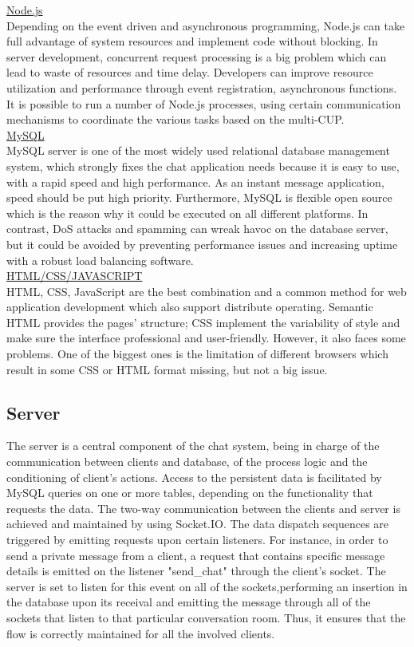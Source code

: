 \documentclass{article}
\begin{document}
\begin{enumerate}
	\underline{Node.js} \\ 
	Depending on the event driven and asynchronous programming, Node.js can take full advantage of system resources and implement code without blocking. In server development, concurrent request processing is a big problem which can lead to waste of resources and time delay. Developers can improve resource utilization and performance through event registration, asynchronous functions. It is possible to run a number of Node.js processes, using certain communication mechanisms to coordinate the various tasks based on the multi-CUP.\\
	
	\underline{MySQL}\\
	MySQL server is one of the most widely used relational database management system, which strongly fixes the chat application needs because it is easy to use, with a rapid speed and high performance. As an instant message application, speed should be put high priority. Furthermore, MySQL is flexible open source which is the reason why it could be executed on all different platforms. In contrast, DoS attacks and spamming can wreak havoc on the database server, but it could be avoided by preventing performance issues and increasing uptime with a robust load balancing software.\\
	
	\underline{HTML/CSS/JAVASCRIPT}\\
	HTML, CSS, JavaScript are the best combination and a common method for web application development which also support distribute operating. Semantic HTML provides the pages’ structure; CSS implement the variability of style and make sure the interface professional and user-friendly. However, it also faces some problems. One of the biggest ones is the limitation of different browsers which result in some CSS or HTML format missing, but not a big issue.\\
	
	\subsection{Server}
	The server is a central component of the chat system, being in charge of the communication between clients and database, of the process logic and the conditioning of client's actions. Access to the persistent data is facilitated by MySQL queries on one or more tables, depending on the functionality that requests the data. The two-way communication between the clients and server is achieved and maintained by using Socket.IO. The data dispatch sequences are triggered by emitting requests upon certain listeners. For instance, in order to send a private message from a client, a request that contains specific message details is emitted on the listener "send\_chat" through the client's socket. The server is set to listen for this event on all of the sockets,performing an insertion in the database upon its receival and emitting the message through all of the sockets that listen to that particular conversation room. Thus, it ensures that the flow is correctly maintained for all the involved clients. \\
	

\end{enumerate}
\end{document}
